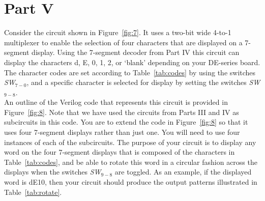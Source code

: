 \documentclass[epsfig,10pt,fullpage]{article}
\begin{document}
\newpage
\section*{Part V}
Consider the circuit shown in  Figure~\ref{fig:7}. It uses a two-bit wide 4-to-1 multiplexer to
enable the selection of four characters that are displayed on a 7-segment display. Using the
7-segment decoder from Part IV this circuit can display the characters d, E, 0, 1, 2, or `blank' 
depending on your DE-series board.
The character codes are set according to Table~\ref{tab:codes} by using the switches 
{\it SW}$_{7-0}$, and a specific character is selected for display by setting the
switches {\it SW}$_{9-8}$.
~\\

An outline of the Verilog code that represents this circuit is 
provided in  Figure~\ref{fig:8}. Note that we have
used the circuits from Parts III and IV as subcircuits in this code. You are to
extend the code in  Figure~\ref{fig:8} so that it uses four 7-segment displays rather 
than just one.  You will need to use four instances of each of the subcircuits. The
purpose of your circuit is to display any word on the four 7-segment displays that is 
composed of the characters in Table~\ref{tab:codes}, and be able to rotate this word in a 
circular fashion across the
displays when the switches {\it SW}$_{9-8}$ are toggled. As an example,
if the displayed word is dE10, then your circuit should produce the output patterns
illustrated in Table~\ref{tab:rotate}.
\end{document}
